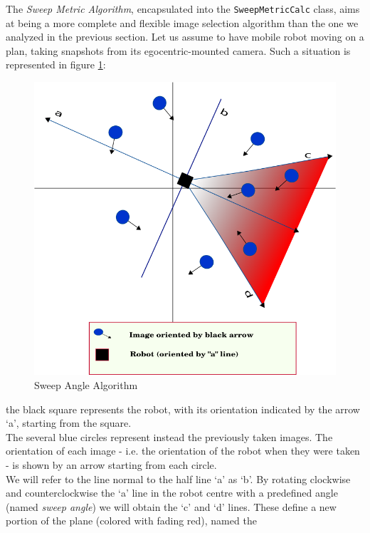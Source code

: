 The  \textit{Sweep Metric Algorithm}, encapsulated into the 
\texttt{SweepMetricCalc} class, aims at being a more 
complete and flexible image selection algorithm than the one 
we analyzed in the previous section.
Let us assume to have  mobile robot moving on a plan, 
taking snapshots from its egocentric-mounted camera.
Such a situation is represented in figure 
\ref{fig:half_plan_finding}:
\begin{figure}[!h]
  \begin{center}
    \includegraphics[width=400pt]{img/half_plan_finding.png} 
    \caption{Sweep Angle Algorithm}
    \label{fig:half_plan_finding}
  \end{center}
\end{figure}
the black square represents the robot, with its orientation 
indicated by the arrow `a', starting from the square.
\\
The several blue circles represent instead the previously
taken images. The orientation of each image - i.e. the 
orientation of the robot when they were taken - 
is shown by an arrow starting from each circle.
\\
We will refer to the line normal to the half line `a' as `b'. 
By rotating clockwise and counterclockwise the `a' line in 
the robot centre with a predefined angle (named \textit{sweep angle})
we will obtain the `c' and `d' lines. These define a new 
portion of the plane (colored with fading red), named the 

